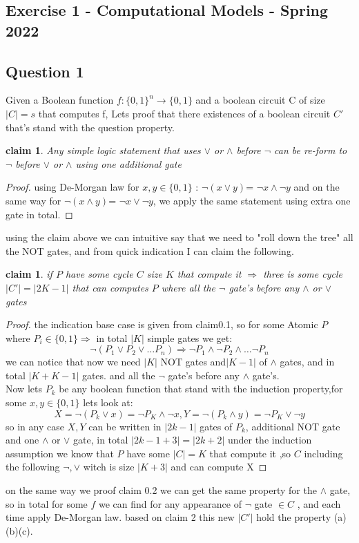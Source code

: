 \documentclass[12pt]{article}
\newtheorem{claim}[theorem]{claim}
\begin{document}
\begin{center}
\section*{Exercise 1 - Computational Models - Spring 2022}
\end{center}
\subsection*{Question 1}
Given a Boolean function $f : \lbrace0, 1\rbrace
^n \rightarrow \lbrace0, 1\rbrace$ and a boolean circuit C of size
$|C| = s$ that computes f, Lets proof that there existences of a boolean circuit $C'$ that's stand with the question property.
\begin{claim}
Any simple logic statement that uses $\vee$ or $ \wedge$ before $ \neg$ can be re-form to $\neg$ before $\vee$ or $ \wedge$ using one additional gate
\end{claim}
\begin{proof}
using De-Morgan law for  $ x,y \in \lbrace0, 1\rbrace$ : $\neg(x \vee y)$= $ \neg x \wedge \neg y$ and on the same way for $\neg(x \wedge y)$= $ \neg x \vee \neg y$, we apply the same statement using extra one gate in total. 
\end{proof}
using the claim above we can intuitive say that we need to "roll down the tree" all the NOT gates, and from quick indication I  can claim the following.
\begin{claim}
if $P$ have some cycle $C$ size $K$ that compute it $\Rightarrow$ three is some cycle $|C'|= |2K-1|$ that can computes $P$ where all the  $\neg$ gate's before any $ \wedge$ or $\vee$ gates
\end{claim}
\begin{proof}
the indication base case is given from claim0.1, so for some Atomic  $P$ where $P_i \in \lbrace0, 1\rbrace \Rightarrow$ in total $|K|$ simple gates we get:
\[  \neg (P_1 \vee P_2 \vee \dots P_n)\Rightarrow \neg P_1 \wedge \neg P_2 \wedge \dots \neg P_n  
\]
we can notice that now we need $|K|$ NOT gates and$|K-1|$ of $\wedge$ gates, and in total $|K+K-1|$  gates.
and all the  $\neg$ gate's before any $ \wedge$ gate's. \\Now lets $P_k$ be any boolean function that stand with the induction property,for some $x,y \in \lbrace0, 1\rbrace$ lets look at: 
\[ X=\neg (P_k\vee x)= \neg P_K \wedge \neg x, Y=\neg (P_k\wedge  y)= \neg P_K \vee \neg y\]
so in any case $X,Y$ can be written in $|2k-1|$ gates of $P_k$, additional NOT gate and one $\wedge$ or $\vee$ gate, in total $|2k-1+3|=|2k+2|$ under the induction assumption we know that $P$ have some $|C|=K$ that compute it ,so $C$ including the following $
\neg , \vee$ witch is size $|K+3|$ and can compute X
\end{proof}
on the same way we proof claim 0.2 we can get the same  property for  the $\wedge$ gate, so in total for some $f$ we can find for any appearance  of $\neg$ gate  $\in C$ , and each time apply De-Morgan law. based on claim 2 this new $|C'|$ hold the property (a)(b)(c).
\end{document}
